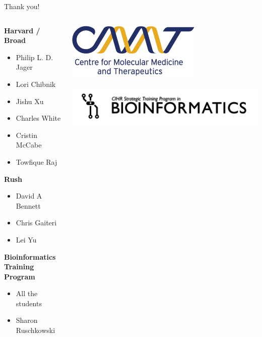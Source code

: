 \documentclass{beamer}
\begin{document}
\begin{frame}{Thank you!}
    \begin{columns}
        \begin{column}{0.5\textwidth}
            \small
            \textbf{Harvard / Broad}
            \begin{itemize}
                \setlength\itemsep{-2pt}
                \item Philip L. D. Jager
                \item Lori Chibnik
                \item Jishu Xu
                \item Charles White
                \item Cristin McCabe
                \item Towfique Raj
            \end{itemize}
            \textbf{Rush}
            \begin{itemize}
                \setlength\itemsep{-2pt}
                \item David A Bennett
                \item Chris Gaiteri
                \item Lei Yu
            \end{itemize}
            \textbf{Bioinformatics Training Program}
            \begin{itemize}
                \setlength\itemsep{-2pt}
                \item All the students
                \item Sharon Ruschkowski
            \end{itemize}
        \end{column}
        \normalsize
        \begin{column}{0.5\textwidth}
            \begin{center}
                \includegraphics[scale=0.3]{doc/logos/cmmt} \\
                \hfill\\
                \includegraphics[scale=0.2]{doc/logos/bioinfo} \\

\end{center}
\end{column}
\end{columns}
\end{frame}
\end{document}

